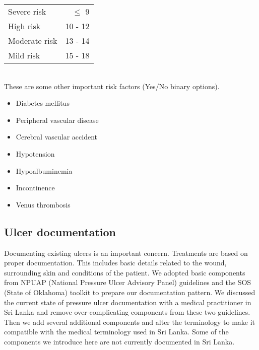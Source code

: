 \begin{tabular}{l r}
	Severe risk &  $\leq$ 9\\
	High risk &  10 - 12\\
	Moderate risk & 13 - 14\\
	Mild risk &  15 - 18 \\
\end{tabular}\\

These are some other important risk factors (Yes/No binary options). 

\begin{itemize}
	\item Diabetes mellitus
	\item Peripheral vascular disease
	\item Cerebral vascular accident
	\item Hypotension
	\item Hypoalbuminemia
	\item Incontinence
	\item Venus thrombosis	
\end{itemize}


\subsection{Ulcer documentation}

Documenting existing ulcers is an important concern. Treatments are based on proper documentation. This includes basic details related to the wound, surrounding skin and conditions of the patient. We adopted basic components from NPUAP (National Pressure Ulcer Advisory Panel) guidelines and the SOS (State of Oklahoma) toolkit to prepare our documentation pattern. We discussed the current state of pressure ulcer documentation with a medical practitioner in Sri Lanka and remove over-complicating components from these two guidelines. Then we add several additional components and alter the terminology to make it compatible with the medical terminology used in Sri Lanka. Some of the components we introduce here are not currently documented in Sri Lanka. 

